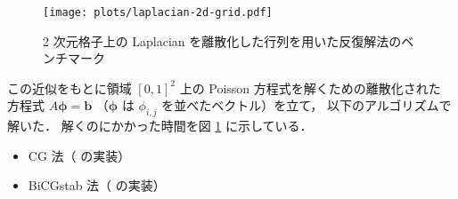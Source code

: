 
\begin{figure}[tp]
    \centering
    \texttt{[image: plots/laplacian-2d-grid.pdf]}
    \caption{2 次元格子上の Laplacian を離散化した行列を用いた反復解法のベンチマーク}
    \label{fig:matrix-computation_bench-laplacian-2d-grid}
\end{figure}

この近似をもとに領域 $[0, 1]^2$ 上の Poisson 方程式を解くための離散化された
方程式 $A \bm{\phi} = \bm{b}$ （$\bm{\phi}$ は $\phi_{i,j}$ を並べたベクトル）を立て，
以下のアルゴリズムで解いた．
解くのにかかった時間を図 \ref{fig:matrix-computation_bench-laplacian-2d-grid} に示している．

\begin{itemize}
    \item CG 法（\cite{EigenLibrary} の実装）
    \item BiCGstab 法（\cite{EigenLibrary} の実装）
\end{itemize}
